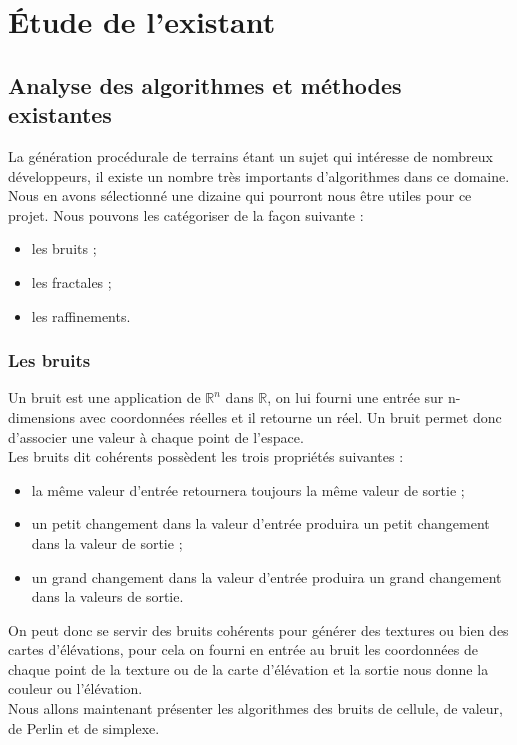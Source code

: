 \chapter{Étude de l'existant}

\section{Analyse des algorithmes et méthodes existantes}
La génération procédurale de terrains étant un sujet qui intéresse de nombreux développeurs, il existe un nombre très importants d'algorithmes dans ce domaine. Nous en avons sélectionné une dizaine qui pourront nous \^etre utiles pour ce projet. Nous pouvons les catégoriser de la façon suivante :
\begin{itemize}
\item les bruits ;
\item les fractales ;
\item les raffinements.
\end{itemize}


\subsection{Les bruits}
Un bruit est une application de $\mathbb R^n$ dans $\mathbb R$, on lui fourni
une entrée sur n-dimensions avec coordonnées réelles et il retourne un réel.
Un bruit permet donc d'associer une valeur à chaque point de l'espace.\\

Les bruits dit cohérents possèdent les trois propriétés suivantes :
\begin{itemize}
\item la même valeur d'entrée retournera toujours la même valeur de sortie ;
\item un petit changement dans la valeur d'entrée produira un petit changement dans la valeur de sortie ;
\item un grand changement dans la valeur d'entrée produira un grand changement
dans la valeurs de sortie.\\
\end{itemize}

On peut donc se servir des bruits cohérents pour générer des textures ou
bien des cartes d'élévations, pour cela on fourni en entrée au bruit les
coordonnées de chaque point de la texture ou de la carte d'élévation
et la sortie nous donne la couleur ou l'élévation.\\
Nous allons maintenant présenter les algorithmes des bruits de cellule, de valeur, de Perlin et de simplexe.

